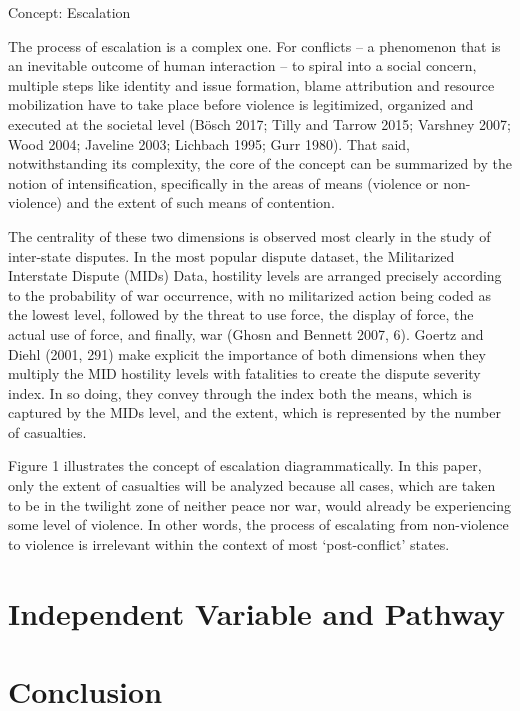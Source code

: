 \documentclass [11pt]{article}
\begin{document}
Concept: Escalation

The process of escalation is a complex one. For conflicts – a phenomenon that is an inevitable outcome of human interaction  – to spiral into a social concern, multiple steps like identity and issue formation, blame attribution and resource mobilization have to take place before violence is legitimized, organized and executed at the societal level (Bösch 2017; Tilly and Tarrow 2015; Varshney 2007; Wood 2004; Javeline 2003; Lichbach 1995; Gurr 1980). That said, notwithstanding its complexity, the core of the concept can be summarized by the notion of intensification, specifically in the areas of means (violence or non-violence) and the extent of such means of contention.

The centrality of these two dimensions is observed most clearly in the study of inter-state disputes. In the most popular dispute dataset, the Militarized Interstate Dispute (MIDs) Data, hostility levels are arranged precisely according to the probability of war occurrence, with no militarized action being coded as the lowest level, followed by the threat to use force, the display of force, the actual use of force, and finally, war (Ghosn and Bennett 2007, 6). Goertz and Diehl (2001, 291) make explicit the importance of both dimensions when they multiply the MID hostility levels with fatalities to create the dispute severity index. In so doing, they convey through the index both the means, which is captured by the MIDs level, and the extent, which is represented by the number of casualties.

Figure 1 illustrates the concept of escalation diagrammatically. In this paper, only the extent of casualties will be analyzed because all cases, which are taken to be in the twilight zone of neither peace nor war, would already be experiencing some level of violence. In other words, the process of escalating from non-violence to violence is irrelevant within the context of most ‘post-conflict’ states.



\section*{Independent Variable and Pathway}











\section*{Conclusion}
\end{document}
